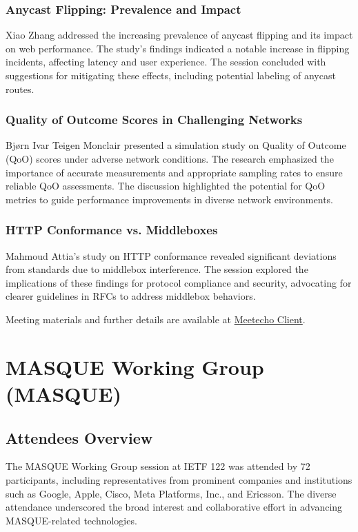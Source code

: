\documentclass{article}
\begin{document}
\subsubsection{Anycast Flipping: Prevalence and Impact}
Xiao Zhang addressed the increasing prevalence of anycast flipping and its impact on web performance. The study's findings indicated a notable increase in flipping incidents, affecting latency and user experience. The session concluded with suggestions for mitigating these effects, including potential labeling of anycast routes.

\subsubsection{Quality of Outcome Scores in Challenging Networks}
Bjørn Ivar Teigen Monclair presented a simulation study on Quality of Outcome (QoO) scores under adverse network conditions. The research emphasized the importance of accurate measurements and appropriate sampling rates to ensure reliable QoO assessments. The discussion highlighted the potential for QoO metrics to guide performance improvements in diverse network environments.

\subsubsection{HTTP Conformance vs. Middleboxes}
Mahmoud Attia's study on HTTP conformance revealed significant deviations from standards due to middlebox interference. The session explored the implications of these findings for protocol compliance and security, advocating for clearer guidelines in RFCs to address middlebox behaviors.

Meeting materials and further details are available at \href{https://meetecho-sin.ietf.org/client/?group=maprg}{Meetecho Client}.




\newpage

\section{MASQUE Working Group (MASQUE)}

\subsection{Attendees Overview}
The MASQUE Working Group session at IETF 122 was attended by 72 participants, including representatives from prominent companies and institutions such as Google, Apple, Cisco, Meta Platforms, Inc., and Ericsson. The diverse attendance underscored the broad interest and collaborative effort in advancing MASQUE-related technologies.
\end{document}
